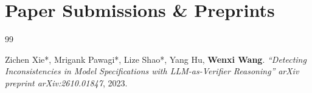\section{Paper Submissions \& Preprints}
\vspace{-3ex}




\renewcommand{\refname}{\vspace{-1cm}}

\begin{thebibliography}{99} %
	
	
	
	
	{ 
		


		Zichen Xie*, Mrigank Pawagi*, Lize Shao*, Yang Hu, \textbf{Wenxi Wang}.
		\emph{``Detecting Inconsistencies in Model Specifications with LLM-as-Verifier Reasoning''}
		\textit{arXiv preprint arXiv:2610.01847}, 2023. 	\href{https://arxiv.org/abs/2610.01847}{\color{color1}{\textbf{[PDF]}}}
		
		
	}
	
\end{thebibliography}



